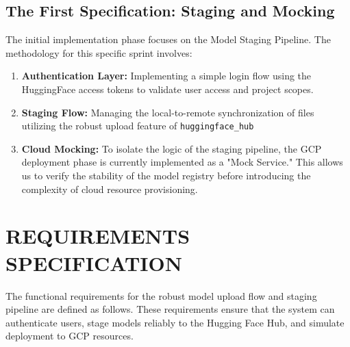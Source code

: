 \documentclass[a4paper,12pt]{report}
\begin{document}
\section{The First Specification: Staging and Mocking}
The initial implementation phase focuses on the Model Staging Pipeline. The methodology for this specific sprint involves:
\begin{enumerate}
\item \textbf{Authentication Layer:} Implementing a simple login flow using the HuggingFace access tokens to validate user access and project scopes.
\item \textbf{Staging Flow:} Managing the local-to-remote synchronization of files utilizing the robust upload feature of \texttt{huggingface\_hub} 
\item \textbf{Cloud Mocking:} To isolate the logic of the staging pipeline, the GCP deployment phase is currently implemented as a "Mock Service." This allows us to verify the stability of the model registry before introducing the complexity of cloud resource provisioning.
\end{enumerate}

\chapter{REQUIREMENTS SPECIFICATION}
The functional requirements for the robust model upload flow and staging pipeline are defined as follows. These requirements ensure that the system can authenticate users, stage models reliably to the Hugging Face Hub, and simulate deployment to GCP resources.
\end{document}
